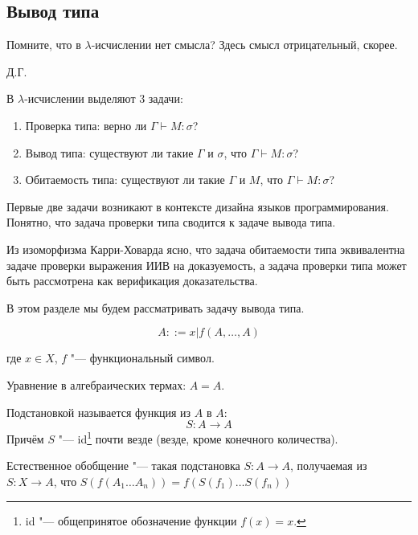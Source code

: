 \subsection{\texorpdfstring{Вывод типа}{Type deduction}}
\epigraph{Помните, что в $\lambda$-исчислении нет смысла? Здесь смысл отрицательный, скорее.}{Д.Г.}

В $\lambda$-исчислении выделяют 3 задачи:
\begin{enumerate}[label=(\asbuk*)]
    \item Проверка типа: верно ли $\Gamma \vdash M : \sigma$?
    \item Вывод типа: существуют ли такие $\Gamma$ и $\sigma$, что $\Gamma \vdash M : \sigma$?
    \item Обитаемость типа: существуют ли такие $\Gamma$ и $M$, что $\Gamma \vdash M : \sigma$?
\end{enumerate}%

Первые две задачи возникают в контексте дизайна языков программирования.
Понятно, что задача проверки типа сводится к задаче вывода типа.

Из изоморфизма Карри-Ховарда ясно, что задача обитаемости типа эквивалентна задаче проверки выражения ИИВ на доказуемость,
а задача проверки типа может быть рассмотрена как верификация доказательства.

В этом разделе мы будем рассматривать задачу вывода типа.

\begin{definition}
    \begin{bnf}
    \[
        A ::= x | f\left(A, \ldots, A\right)
    \]
    \end{bnf}%
    где $x \in X$, $f$ "--- функциональный символ.
\end{definition}

Уравнение в алгебраических термах: $A = A$.

\begin{definition}[подстановка] Подстановкой называется функция из $A$ в $A$:
    \[
        S : A \to A
    \]
    Причём $S$ "--- id\footnote{id "--- общепринятое обозначение функции $f(x)=x$.} почти везде (везде, кроме конечного количества).
\end{definition}

\begin{definition}
    Естественное обобщение "--- такая подстановка $S : A \to A$, получаемая из $S : X \to A$, что
    $S\left(f\left(A_1 \dots A_n\right)\right) = f\left(S(f_1) \ldots S(f_n)\right)$
\end{definition}

